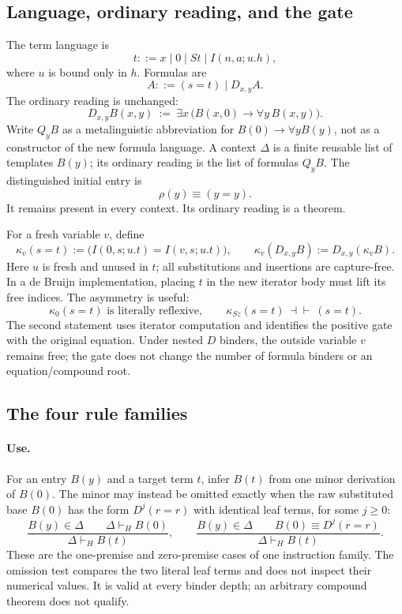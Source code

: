 \documentclass[11pt]{article}
\theoremstyle{definition}\newtheorem{definition}[theorem]{Definition}
\theoremstyle{remark}\newtheorem{remark}[theorem]{Remark}
\begin{document}
\subsection{Language, ordinary reading, and the gate}

The term language is
\[
 t ::= x\mid 0\mid St\mid I(n,a;u.h),
\]
where $u$ is bound only in $h$.  Formulas are
\[
 A ::= (s=t)\mid D_{x,y}A.
\]
The ordinary reading is unchanged:
\[
 D_{x,y}B(x,y)\ :=\ \exists x\,
             \bigl(B(x,0)\to\forall y\,B(x,y)\bigr).
\]
Write $Q_yB$ as a metalinguistic abbreviation for
$B(0)\to\forall yB(y)$, not as a constructor of the new formula language.
A context $\Delta$ is a finite reusable list of templates $B(y)$; its
ordinary reading is the list of formulas $Q_yB$.  The distinguished
initial entry is
\[
 \rho(y)\equiv(y=y).
\]
It remains present in every context.  Its ordinary reading is a theorem.

For a fresh variable $v$, define
\[
 \kappa_v(s=t)
   :=\bigl(I(0,s;u.t)=I(v,s;u.t)\bigr),
 \qquad
 \kappa_v(D_{x,y}B):=D_{x,y}(\kappa_vB).
\]
Here $u$ is fresh and unused in $t$; all substitutions and insertions are
capture-free.  In a de Bruijn implementation, placing $t$ in the new
iterator body must lift its free indices.  The asymmetry is useful:
\[
 \kappa_0(s=t)\text{ is literally reflexive},\qquad
 \kappa_{Sz}(s=t)\ \dashv\vdash\ (s=t).
\]
The second statement uses iterator computation and identifies the
positive gate with the original equation.  Under nested
$D$ binders, the outside variable $v$ remains free; the gate does not
change the number of formula binders or an equation/compound root.

\subsection{The four rule families}

\paragraph{Use.}
For an entry $B(y)$ and a target term $t$, infer $B(t)$ from one minor
derivation of $B(0)$.  The minor may instead be omitted exactly when the
raw substituted base $B(0)$ has the form $D^j(r=r)$ with identical
leaf terms, for some $j\ge0$:
\[
 \frac{B(y)\in\Delta\qquad\Delta\vdash_H B(0)}
      {\Delta\vdash_H B(t)},
 \qquad
 \frac{B(y)\in\Delta\qquad B(0)\equiv D^j(r=r)}
      {\Delta\vdash_H B(t)}.
 \tag{Use}
\]
These are the one-premise and zero-premise cases of one instruction
family.  The omission test compares the two literal leaf terms and
does not inspect their numerical values.  It is valid at every binder
depth; an arbitrary compound theorem does not qualify.
\end{document}
